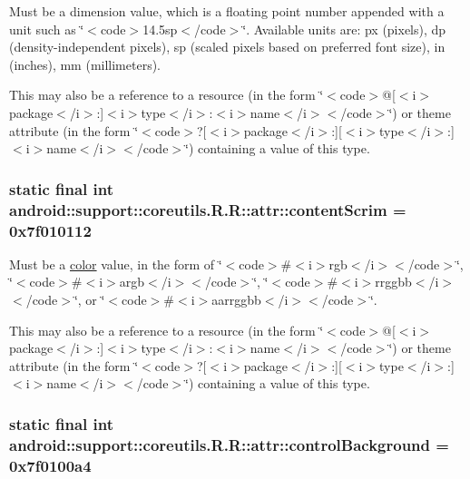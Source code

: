 Must be a dimension value, which is a floating point number appended with a unit such as \char`\"{}$<$code$>$14.5sp$<$/code$>$\char`\"{}. Available units are: px (pixels), dp (density-independent pixels), sp (scaled pixels based on preferred font size), in (inches), mm (millimeters). 

This may also be a reference to a resource (in the form \char`\"{}$<$code$>$@\mbox{[}$<$i$>$package$<$/i$>$:\mbox{]}$<$i$>$type$<$/i$>$:$<$i$>$name$<$/i$>$$<$/code$>$\char`\"{}) or theme attribute (in the form \char`\"{}$<$code$>$?\mbox{[}$<$i$>$package$<$/i$>$:\mbox{]}\mbox{[}$<$i$>$type$<$/i$>$:\mbox{]}$<$i$>$name$<$/i$>$$<$/code$>$\char`\"{}) containing a value of this type. \hypertarget{classandroid_1_1support_1_1coreutils_1_1_r_1_1attr_91d0e6a0f2b97c63c4ca4f09a0b2f6dc}{
\subsubsection[{contentScrim}]{\setlength{\rightskip}{0pt plus 5cm}static final int android::support::coreutils.R.R::attr::contentScrim = 0x7f010112}}
\label{classandroid_1_1support_1_1coreutils_1_1_r_1_1attr_91d0e6a0f2b97c63c4ca4f09a0b2f6dc}


Must be a \hyperlink{classandroid_1_1support_1_1coreutils_1_1_r_1_1color}{color} value, in the form of \char`\"{}$<$code$>$\#$<$i$>$rgb$<$/i$>$$<$/code$>$\char`\"{}, \char`\"{}$<$code$>$\#$<$i$>$argb$<$/i$>$$<$/code$>$\char`\"{}, \char`\"{}$<$code$>$\#$<$i$>$rrggbb$<$/i$>$$<$/code$>$\char`\"{}, or \char`\"{}$<$code$>$\#$<$i$>$aarrggbb$<$/i$>$$<$/code$>$\char`\"{}. 

This may also be a reference to a resource (in the form \char`\"{}$<$code$>$@\mbox{[}$<$i$>$package$<$/i$>$:\mbox{]}$<$i$>$type$<$/i$>$:$<$i$>$name$<$/i$>$$<$/code$>$\char`\"{}) or theme attribute (in the form \char`\"{}$<$code$>$?\mbox{[}$<$i$>$package$<$/i$>$:\mbox{]}\mbox{[}$<$i$>$type$<$/i$>$:\mbox{]}$<$i$>$name$<$/i$>$$<$/code$>$\char`\"{}) containing a value of this type. \hypertarget{classandroid_1_1support_1_1coreutils_1_1_r_1_1attr_69e1ebcd1825d62cf5190d293d95f367}{
\subsubsection[{controlBackground}]{\setlength{\rightskip}{0pt plus 5cm}static final int android::support::coreutils.R.R::attr::controlBackground = 0x7f0100a4}}
\label{classandroid_1_1support_1_1coreutils_1_1_r_1_1attr_69e1ebcd1825d62cf5190d293d95f367}


